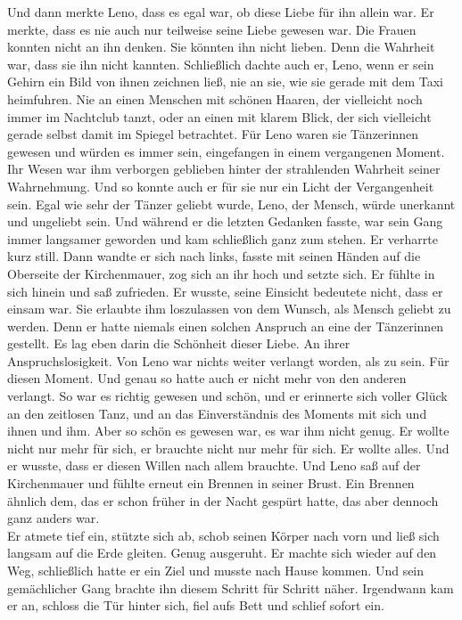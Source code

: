 \documentclass[ngerman,smalldemyvopaper,11pt,oneside,onecolumn,openright,extrafontsizes]{memoir}
\begin{document}
Und dann merkte Leno, dass es egal war, ob diese Liebe für ihn allein war. Er merkte, dass es nie auch nur teilweise seine Liebe gewesen war. Die Frauen konnten nicht an ihn denken. Sie könnten ihn nicht lieben. Denn die Wahrheit war, dass sie ihn nicht kannten. Schließlich dachte auch er, Leno, wenn er sein Gehirn ein Bild von ihnen zeichnen ließ, nie an sie, wie sie gerade mit dem Taxi heimfuhren. Nie an einen Menschen mit schönen Haaren, der vielleicht noch immer im Nachtclub tanzt, oder an einen mit klarem Blick, der sich vielleicht gerade selbst damit im Spiegel betrachtet. Für Leno waren sie Tänzerinnen gewesen und würden es immer sein, eingefangen in einem vergangenen Moment. Ihr Wesen war ihm verborgen geblieben hinter der strahlenden Wahrheit seiner Wahrnehmung. Und so konnte auch er für sie nur ein Licht der Vergangenheit sein. Egal wie sehr der Tänzer geliebt wurde, Leno, der Mensch, würde unerkannt und ungeliebt sein. Und während er die letzten Gedanken fasste, war sein Gang immer langsamer geworden und kam schließlich ganz zum stehen. Er verharrte kurz still. Dann wandte er sich nach links, fasste mit seinen Händen auf die Oberseite der Kirchenmauer, zog sich an ihr hoch und setzte sich. Er fühlte in sich hinein und saß zufrieden. Er wusste, seine Einsicht bedeutete nicht, dass er einsam war. Sie erlaubte ihm loszulassen von dem Wunsch, als Mensch geliebt zu werden. Denn er hatte niemals einen solchen Anspruch an eine der Tänzerinnen gestellt. Es lag eben darin die Schönheit dieser Liebe. An ihrer Anspruchslosigkeit. Von Leno war nichts weiter verlangt worden, als zu sein. Für diesen Moment. Und genau so hatte auch er nicht mehr von den anderen verlangt. So war es richtig gewesen und schön, und er erinnerte sich voller Glück an den zeitlosen Tanz, und an das Einverständnis des Moments mit sich und ihnen und ihm. Aber so schön es gewesen war, es war ihm nicht genug. Er wollte nicht nur mehr für sich, er brauchte nicht nur mehr für sich. Er wollte alles. Und er wusste, dass er diesen Willen nach allem brauchte. Und Leno saß auf der Kirchenmauer und fühlte erneut ein Brennen in seiner Brust. Ein Brennen ähnlich dem, das er schon früher in der Nacht gespürt hatte, das aber dennoch ganz anders war.\\
Er atmete tief ein, stützte sich ab, schob seinen Körper nach vorn und ließ sich langsam auf die Erde gleiten. Genug ausgeruht. Er machte sich wieder auf den Weg, schließlich hatte er ein Ziel und musste nach Hause kommen. Und sein gemächlicher Gang brachte ihn diesem Schritt für Schritt näher. Irgendwann kam er an, schloss die Tür hinter sich, fiel aufs Bett und schlief sofort ein.
\end{document}
